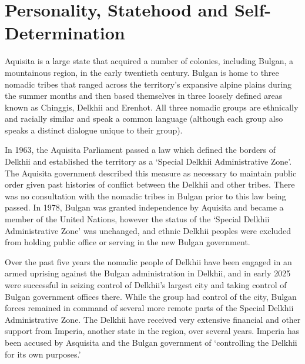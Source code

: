 \section{Personality, Statehood and Self-Determination}
\begin{tutorialquestion}
    \flushleft
    
    Aquisita is a large state that acquired a number of colonies, including Bulgan, a mountainous region, in the early twentieth century. Bulgan is home to three nomadic tribes that ranged across the territory's expansive alpine plains during the summer months and then based themselves in three loosely defined areas known as Chinggis, Delkhii and Erenhot. All three nomadic groups are ethnically and racially similar and speak a common language (although
    each group also speaks a distinct dialogue unique to their group).

    \vspace{\baselineskip}

    In 1963, the Aquisita Parliament passed a law which defined the borders of Delkhii and established the territory as a `Special Delkhii Administrative Zone'. The Aquisita government described this measure as necessary to maintain public order given past histories of conflict between the Delkhii and other tribes. There was no consultation with the nomadic tribes in Bulgan prior to this law being passed. In 1978, Bulgan was granted independence by Aquisita
    and became a member of the United Nations, however the status of the `Special Delkhii Administrative Zone' was unchanged, and ethnic Delkhii peoples were excluded from holding public office or serving in the new Bulgan government.

    \vspace{\baselineskip}

    Over the past five years the nomadic people of Delkhii have been engaged in an armed uprising against the Bulgan administration in Delkhii, and in early 2025 were successful in seizing control of Delkhii's largest city and taking control of Bulgan government offices there. While the group had control of the city, Bulgan forces remained in command of several more remote parts of the Special Delkhii Administrative Zone. The Delkhii have received very extensive financial and other support from Imperia, another state in the region, over several years. Imperia has been accused by Asquisita and the Bulgan government of `controlling the Delkhii for its own purposes.'

    \vspace{\baselineskip}


\end{tutorialquestion}

